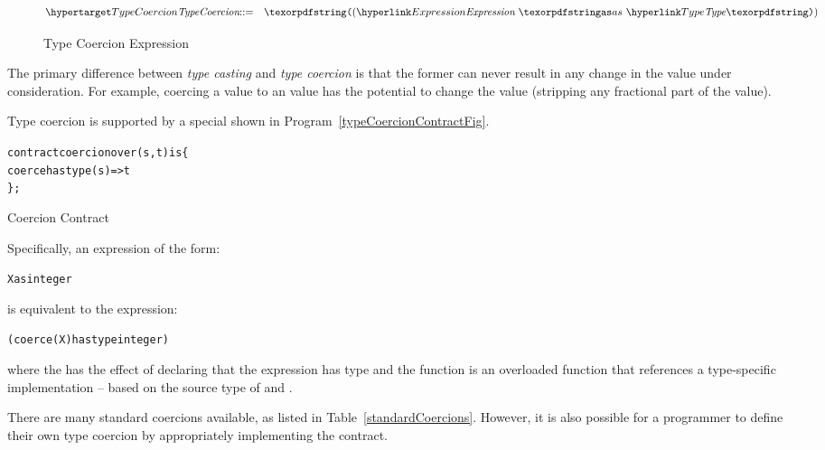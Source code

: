 \begin{figure}[htbp]
\begin{eqnarray*}
\ntDef{TypeCoercion}&\arrow&\q{(}\ntRef{Expression}\ \q{as}\ \ntRef{Type}\q{)}
\end{eqnarray*}
\caption{Type Coercion Expression}
\label{typeCoercionExpressionFig}
\end{figure}

The primary difference between \emph{type casting} and \emph{type coercion} is that the former can never result in any change in the value under consideration. For example, coercing a  value to an  value has the potential to change the value (stripping any fractional part of the value).

Type coercion is supported by a special   shown in Program~\vref{typeCoercionContractFig}.

\begin{program}
\begin{alltt}
contract coercion over (s,t) is \{
  coerce has type (s)=>t
\};
\end{alltt}
\label{typeCoercionContractFig}
\caption{Coercion Contract }
\end{program}

\begin{aside}
Specifically, an expression of the form:
\begin{alltt}
X as integer
\end{alltt}
is equivalent to the expression:
\begin{alltt}
(coerce(X) has type integer)
\end{alltt}
where the  has the effect of declaring that the expression has type  and the  function is an overloaded function that references a type-specific implementation -- based on the source type of  and .
\end{aside}

There are many standard coercions available, as listed in Table~\vref{standardCoercions}. However, it is also possible for a programmer to define their own type coercion by appropriately implementing the  contract.


